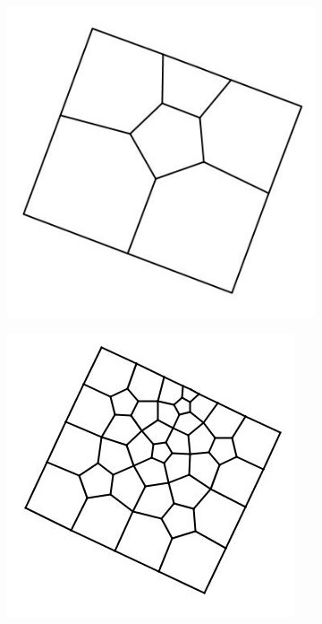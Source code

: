 \begin{figure}\centering
    \begin{subfigure}{0.25\linewidth}
        \includegraphics[width=\linewidth]{img/pentl1}
    \end{subfigure}
    \begin{subfigure}{0.25\linewidth}
        \includegraphics[width=\linewidth]{img/pentl2}

\end{subfigure}
\end{figure}
